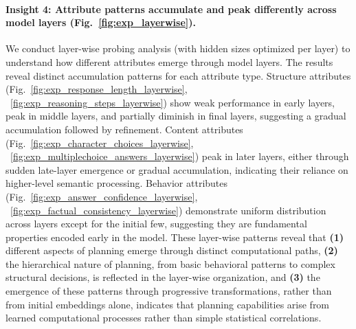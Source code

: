 \paragraph{Insight 4: Attribute patterns accumulate and peak differently across model layers (Fig.~\ref{fig:exp_layerwise}).}
We conduct layer-wise probing analysis (with hidden sizes optimized per layer) to understand how different attributes emerge through model layers. The results reveal distinct accumulation patterns for each attribute type. Structure attributes (Fig.~\ref{fig:exp_response_length_layerwise}, ~\ref{fig:exp_reasoning_steps_layerwise}) show weak performance in early layers, peak in middle layers, and partially diminish in final layers, suggesting a gradual accumulation followed by refinement. Content attributes (Fig.~\ref{fig:exp_character_choices_layerwise}, ~\ref{fig:exp_multiplechoice_answers_layerwise}) peak in later layers, either through sudden late-layer emergence or gradual accumulation, indicating their reliance on higher-level semantic processing. Behavior attributes (Fig.~\ref{fig:exp_answer_confidence_layerwise}, ~\ref{fig:exp_factual_consistency_layerwise}) demonstrate uniform distribution across layers except for the initial few, suggesting they are fundamental properties encoded early in the model.
These layer-wise patterns reveal that \textbf{(1)} different aspects of planning emerge through distinct computational paths, \textbf{(2)} the hierarchical nature of planning, from basic behavioral patterns to complex structural decisions, is reflected in the layer-wise organization, and \textbf{(3)} the emergence of these patterns through progressive transformations, rather than from initial embeddings alone, indicates that planning capabilities arise from learned computational processes rather than simple statistical correlations.












